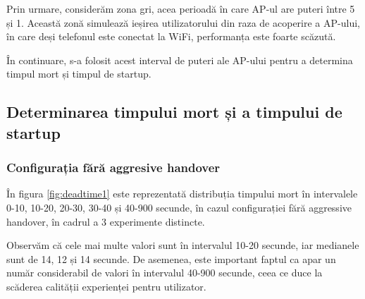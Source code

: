 Prin urmare, considerăm zona gri, acea perioadă în care AP-ul are puteri între 5 și 1. Această zonă simulează ieșirea utilizatorului din raza de acoperire a AP-ului, în care deși telefonul este conectat la WiFi, performanța este foarte scăzută. 

În continuare, s-a folosit acest interval de puteri ale AP-ului pentru a determina timpul mort și timpul de startup.

\subsection{Determinarea timpului mort și a timpului de startup}

\subsubsection{Configurația fără aggresive handover}

În figura \ref{fig:deadtime1} este reprezentată distribuția timpului mort în intervalele 0-10, 10-20, 20-30, 30-40 și 40-900 secunde, în cazul configurației fără aggressive handover, în cadrul a 3 experimente distincte. 

Observăm că cele mai multe valori sunt în intervalul 10-20 secunde, iar medianele sunt de 14, 12 și 14 secunde. De asemenea, este important faptul ca apar un număr considerabil de valori în intervalul 40-900 secunde, ceea ce duce la scăderea calității experienței pentru utilizator. 

